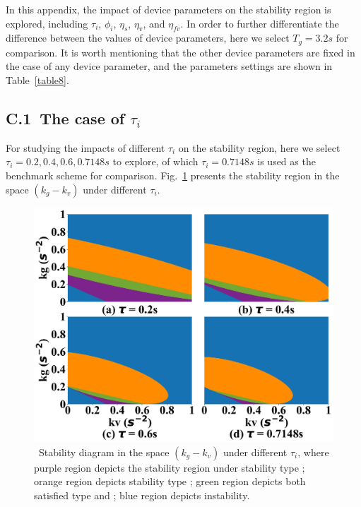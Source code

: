 \documentclass[a4paper]{cas-sc}
\begin{document}
\label{AppendixB}

In this appendix, the impact of device parameters on the stability region is explored, including $\tau_i$, $\phi_i$, $\eta_s$, $\eta_v$, and $\eta_{fv}$. In order to further differentiate the difference between the values of device parameters, here we select $T_g = 3.2s$ for comparison. It is worth mentioning that the other device parameters are fixed in the case of any device parameter, and the parameters settings are shown in Table~\ref{table8}.

\subsection*{C.1~The case of $\tau_i$}

For studying the impacts of different $\tau_i$ on the stability region, here we select $\tau_i=0.2,0.4,0.6,0.7148 s$ to explore, of which $\tau_i=0.7148s$ is used as the benchmark scheme for comparison. Fig.~\ref{fig8} presents the stability region in the space $(k_g-k_v)$ under different $\tau_i$.

\begin{figure}
  \centering
  \includegraphics[width=14cm]{figs/fig8.png}
  \caption{~Stability diagram in the space $(k_g-k_v)$ under different $\tau_i$, where purple region depicts the stability region under stability type \uppercase\expandafter{}; orange region depicts stability type \uppercase\expandafter{}; green region depicts both satisfied type \uppercase\expandafter{} and \uppercase\expandafter{}; blue region depicts instability.}
  \label{fig8}
\end{figure}
\end{document}
